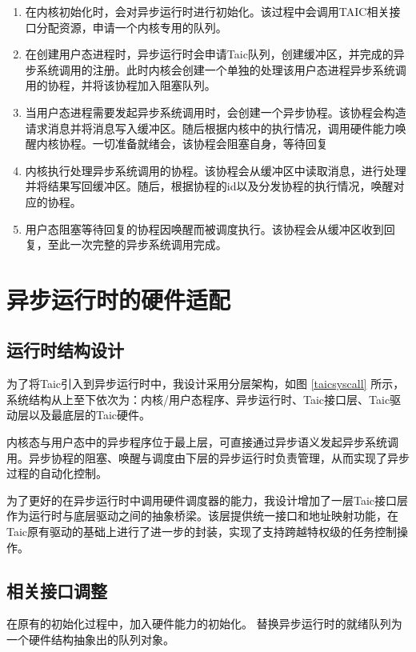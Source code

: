 \begin{enumerate}
  \item 在内核初始化时，会对异步运行时进行初始化。该过程中会调用TAIC相关接口分配资源，申请一个内核专用的队列。
  \item 在创建用户态进程时，异步运行时会申请Taic队列，创建缓冲区，并完成的异步系统调用的注册。此时内核会创建一个单独的处理该用户态进程异步系统调用的协程，并将该协程加入阻塞队列。
  \item 当用户态进程需要发起异步系统调用时，会创建一个异步协程。该协程会构造请求消息并将消息写入缓冲区。随后根据内核中的执行情况，调用硬件能力唤醒内核协程。一切准备就绪会，该协程会阻塞自身，等待回复
  \item 内核执行处理异步系统调用的协程。该协程会从缓冲区中读取消息，进行处理并将结果写回缓冲区。随后，根据协程的id以及分发协程的执行情况，唤醒对应的协程。
  \item 用户态阻塞等待回复的协程因唤醒而被调度执行。该协程会从缓冲区收到回复，至此一次完整的异步系统调用完成。
\end{enumerate}

\section{异步运行时的硬件适配}

\subsection{运行时结构设计}

为了将Taic引入到异步运行时中，我设计采用分层架构，如图 \ref{taicsyscall} 所示，系统结构从上至下依次为：内核/用户态程序、异步运行时、Taic接口层、Taic驱动层以及最底层的Taic硬件。

内核态与用户态中的异步程序位于最上层，可直接通过异步语义发起异步系统调用。异步协程的阻塞、唤醒与调度由下层的异步运行时负责管理，从而实现了异步过程的自动化控制。

为了更好的在异步运行时中调用硬件调度器的能力，我设计增加了一层Taic接口层作为运行时与底层驱动之间的抽象桥梁。该层提供统一接口和地址映射功能，在Taic原有驱动的基础上进行了进一步的封装，实现了支持跨越特权级的任务控制操作。

\subsection{相关接口调整}

在原有的初始化过程中，加入硬件能力的初始化。
替换异步运行时的就绪队列为一个硬件结构抽象出的队列对象。

